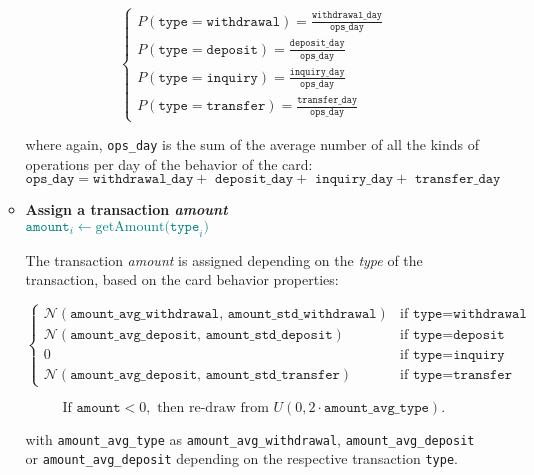 \begin{enumerate}
\begin{itemize}
        $$
        \begin{cases}
          P(\texttt{type} =  \texttt{withdrawal}) = \frac{\texttt{withdrawal\_day}}{\texttt{ops\_day}} \\[8pt]
          P(\texttt{type} =  \texttt{deposit}) = \frac{\texttt{deposit\_day}}{\texttt{ops\_day}} \\[8pt]
          P(\texttt{type} = \texttt{inquiry}) = \frac{\texttt{inquiry\_day}}{\texttt{ops\_day}} \\[8pt]
          P(\texttt{type} =  \texttt{transfer}) = \frac{\texttt{transfer\_day}}{\texttt{ops\_day}} 
        \end{cases}
        $$

        where again, \texttt{ops\_day} is the sum of the average number of all the kinds of operations per day of the behavior of the card: 
        $$\texttt{ops\_day} = \texttt{withdrawal\_day} + \texttt{ deposit\_day} + \texttt{ inquiry\_day} + \texttt{ transfer\_day}$$

        \item \textbf{Assign a transaction \emph{amount}}\\
        {\footnotesize \textcolor{teal}{$\texttt{amount}_{i} \gets  \text{getAmount(}\texttt{type}_{i}\text{)}$}}
          
        The transaction \emph{amount} is assigned depending on the \emph{type} of the transaction, based on the card behavior properties:
            
          $$
          \begin{cases}
            \mathcal{N}(\texttt{amount\_avg\_withdrawal},\, \texttt{amount\_std\_withdrawal}) & \text{if } \texttt{type} = \texttt{withdrawal} \\[10pt]
            
            \mathcal{N}(\texttt{amount\_avg\_deposit},\, \texttt{amount\_std\_deposit}) & \text{if } \texttt{type} = \texttt{deposit} \\[10pt]
        
            0 & \text{if } \texttt{type} = \texttt{inquiry} \\[10pt]
            
            \mathcal{N}(\texttt{amount\_avg\_deposit},\, \texttt{amount\_std\_transfer}) & \text{if } \texttt{type} = \texttt{transfer}
          \end{cases}
          $$
        
          $$
          \text{If } \texttt{amount} < 0, \text{ then re-draw from } U(0, 2 \cdot \texttt{amount\_avg\_type}).
          $$
        
          with \texttt{amount\_avg\_type} as \texttt{amount\_avg\_withdrawal}, \texttt{amount\_avg\_deposit} or \texttt{amount\_avg\_deposit} depending on the respective transaction \texttt{type}.   
    \end{itemize}
\end{enumerate}

